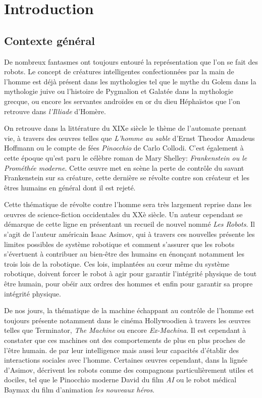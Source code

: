 \documentclass[a4paper,11pt,twoside]{StyleThese}
\begin{document}
\setcounter{chapter}{0} %
\dominitoc
\faketableofcontents
\fi

\chapter{Introduction}
\minitoc

\section{Contexte général}
De nombreux fantasmes ont toujours entouré la représentation que l'on se fait des robots. Le concept de créatures intelligentes confectionnées par la main de l'homme est déjà présent dans les mythologies tel que le mythe du Golem dans la mythologie juive ou l'histoire de Pygmalion et Galatée dans la mythologie grecque, ou encore les servantes androïdes en or du dieu Héphaïstos que l'on retrouve dans \textit{l'Illiade} d'Homère.

On retrouve dans la littérature du XIXe siècle le thème de l'automate prenant vie, à travers des œuvres telles que \textit{L'homme au sable} d'Ernst Theodor Amadeus Hoffmann ou le compte de fées \textit{Pinocchio} de Carlo Collodi. C'est également à cette époque qu'est paru le célèbre roman de Mary Shelley: \textit{Frankenstein ou le Prométhée moderne}. Cette œuvre met en scène la perte de contrôle du savant Frankenstein sur sa créature, cette dernière se révolte contre son créateur et les êtres humains en général dont il est rejeté. 

Cette thématique de révolte contre l'homme sera très largement reprise dans les œuvres de science-fiction occidentales du XXè siècle. Un auteur cependant se démarque de cette ligne en présentant un recueil de nouvel nommé \textit{Les Robots}. Il s'agit de l'auteur américain Isaac Asimov, qui à travers ces nouvelles présente les limites possibles de système robotique et comment s'assurer que les robots s'évertuent à contribuer au bien-être des humains en énonçant notamment les trois lois de la robotique. Ces lois, implantées au cœur même du système robotique, doivent forcer le robot à agir pour garantir l'intégrité physique de tout être humain, pour obéir aux ordres des hommes et enfin pour garantir sa propre intégrité physique.

De nos jours, la thématique de la machine échappant au contrôle de l'homme est toujours présente notamment dans le cinéma Hollywoodien à travers les œuvres telles que Terminator, \textit{The Machine} ou encore \textit{Ex-Machina}. Il est cependant à constater que ces machines ont des comportements de plus en plus proches de l'être humain.  de par leur intelligence mais aussi leur capacités d'établir des interactions sociales  avec l'homme.
Certaines œuvres cependant, dans la lignée d'Asimov, décrivent les robots comme des compagnons particulièrement utiles et dociles, tel que le Pinocchio moderne David du film \textit{AI} ou le robot médical Baymax du film d'animation \textit{les nouveaux héros}.
\end{document}
